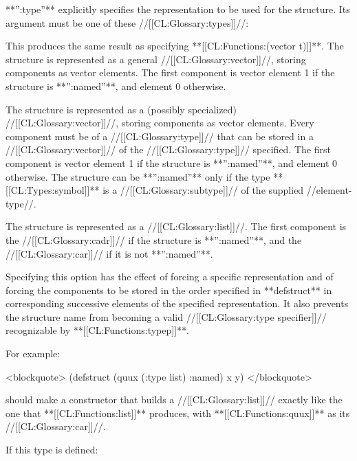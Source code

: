 
**'':type''** explicitly specifies the representation to be used for the structure. Its argument must be one of these //[[CL:Glossary:types]]//:

\beginlist


This produces the same result as specifying **[[CL:Functions:(vector t)]]**. The structure is represented as a general //[[CL:Glossary:vector]]//, storing components as vector elements. The first component is vector element 1 if the structure is **'':named''**, and element 0 otherwise.



The structure is represented as a (possibly specialized) //[[CL:Glossary:vector]]//, storing components as vector elements. Every component must be of a //[[CL:Glossary:type]]// that can be stored in a //[[CL:Glossary:vector]]// of the //[[CL:Glossary:type]]// specified. The first component is vector element 1 if the structure is **'':named''**, and element 0 otherwise. The structure can be **'':named''** only if the type **[[CL:Types:symbol]]** is a //[[CL:Glossary:subtype]]// of the supplied //element-type//.


The structure is represented as a //[[CL:Glossary:list]]//. The first component is the //[[CL:Glossary:cadr]]// if the structure is **'':named''**, and the //[[CL:Glossary:car]]// if it is not **'':named''**. \endlist

Specifying this option has the effect of forcing a specific representation and of forcing the components to be stored in the order specified in **defstruct** in corresponding successive elements of the specified representation. It also prevents the structure name from becoming a valid //[[CL:Glossary:type specifier]]// recognizable by **[[CL:Functions:typep]]**.

For example:

<blockquote> (defstruct (quux (:type list) :named) x y) </blockquote>

should make a constructor that builds a //[[CL:Glossary:list]]// exactly like the one that **[[CL:Functions:list]]** produces, with **[[CL:Functions:quux]]** as its //[[CL:Glossary:car]]//.

If this type is defined:

